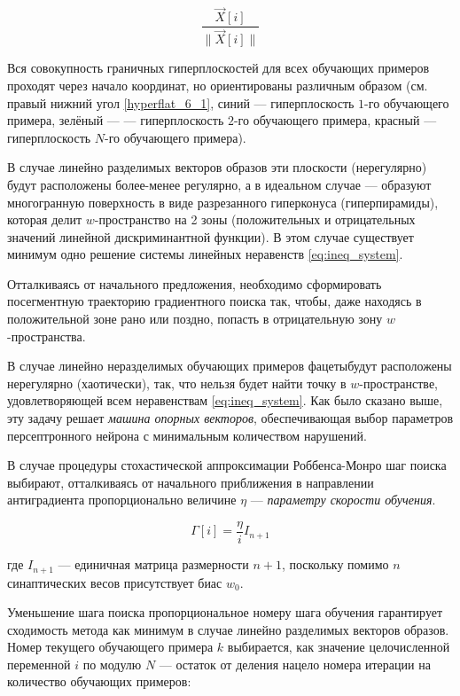 \documentclass[a4paper]{article}
\numberwithin{equation}{subsection}
\begin{document}
\begin{equation*}
    \dfrac{\vec{X}[i]}{\|\vec{X}[i]\|}
\end{equation*}

Вся совокупность граничных гиперплоскостей для всех обучающих примеров проходят через 
начало координат, но ориентированы различным образом (см. правый нижний угол 
\ref{hyperflat_6_1}, синий --- гиперплоскость $1$-го обучающего примера, зелёный ---
--- гиперплоскость $2$-го обучающего примера, красный --- гиперплоскость $N$-го 
обучающего примера).

В случае линейно разделимых векторов образов эти плоскости (\glqq нерегулярно\grqq) 
будут расположены более-менее регулярно, а в идеальном случае --- образуют 
многогранную поверхность в виде разрезанного гиперконуса (гиперпирамиды), 
которая делит $w$-пространство на 2 зоны (положительных и отрицательных значений 
линейной дискриминантной функции).
В этом случае существует минимум одно решение системы линейных неравенств 
\ref{eq:ineq_system}.

Отталкиваясь от начального предложения, необходимо сформировать посегментную траекторию 
градиентного поиска так, чтобы, даже находясь в положительной зоне рано или поздно,
попасть в отрицательную зону $w$-пространства. 

В случае линейно неразделимых обучающих примеров \glqq фацеты\grqq будут расположены
нерегулярно (хаотически), так, что нельзя будет найти точку в $w$-пространстве, 
удовлетворяющей всем неравенствам \ref{eq:ineq_system}. Как было сказано выше,
эту задачу решает \textit{машина опорных векторов}, обеспечивающая выбор параметров
персептронного нейрона с минимальным количеством нарушений.

В случае процедуры стохастической аппроксимации Роббенса-Монро шаг поиска выбирают,
отталкиваясь от начального приближения в направлении антиградиента пропорционально
величине $\eta$ --- \textit{параметру скорости обучения}.

\begin{equation}
    \Gamma[i] = \dfrac{\eta}{i} I_{n+1}
\end{equation}

\noindent
где $I_{n+1}$ --- единичная матрица размерности $n+1$, поскольку помимо $n$ синаптических
весов присутствует биас $w_0$.

Уменьшение шага поиска пропорциональное номеру шага обучения гарантирует сходимость метода
как минимум в случае линейно разделимых векторов образов.
Номер текущего обучающего примера $k$ выбирается, как значение целочисленной переменной $i$ 
по модулю $N$ --- остаток от деления нацело номера итерации на количество обучающих 
примеров:
\end{document}

